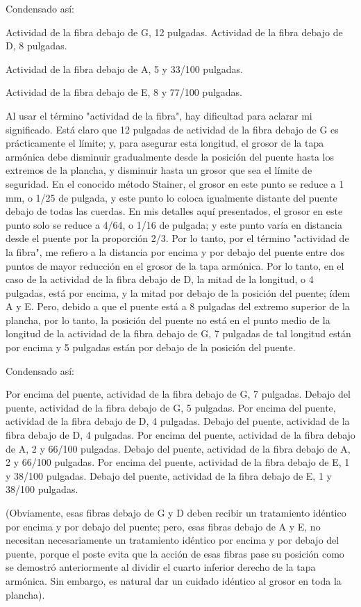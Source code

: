 \documentclass[12pt]{book}
\begin{document}
Condensado así:

Actividad de la fibra debajo de G, 12 pulgadas. Actividad de la fibra debajo de D, 8 pulgadas.

Actividad de la fibra debajo de A, 5 y 33/100 pulgadas.

Actividad de la fibra debajo de E, 8 y 77/100 pulgadas.

Al usar el término "actividad de la fibra", hay dificultad para aclarar mi significado. Está claro que 12 pulgadas de actividad de la fibra debajo de G es prácticamente el límite; y, para asegurar esta longitud, el grosor de la tapa armónica debe disminuir gradualmente desde la posición del puente hasta los extremos de la plancha, y disminuir hasta un grosor que sea el límite de seguridad. En el conocido método Stainer, el grosor en este punto se reduce a 1 mm, o 1/25 de pulgada, y este punto lo coloca igualmente distante del puente debajo de todas las cuerdas. En mis detalles aquí presentados, el grosor en este punto solo se reduce a 4/64, o 1/16 de pulgada; y este punto varía en distancia desde el puente por la proporción 2/3. Por lo tanto, por el término "actividad de la fibra", me refiero a la distancia por encima y por debajo del puente entre dos puntos de mayor reducción en el grosor de la tapa armónica. Por lo tanto, en el caso de la actividad de la fibra debajo de D, la mitad de la longitud, o 4 pulgadas, está por encima, y la mitad por debajo de la posición del puente; ídem A y E. Pero, debido a que el puente está a 8 pulgadas del extremo superior de la plancha, por lo tanto, la posición del puente no está en el punto medio de la longitud de la actividad de la fibra debajo de G, 7 pulgadas de tal longitud están por encima y 5 pulgadas están por debajo de la posición del puente.

Condensado así:

Por encima del puente, actividad de la fibra debajo de G, 7 pulgadas. Debajo del puente, actividad de la fibra debajo de G, 5 pulgadas. Por encima del puente, actividad de la fibra debajo de D, 4 pulgadas. Debajo del puente, actividad de la fibra debajo de D, 4 pulgadas. Por encima del puente, actividad de la fibra debajo de A, 2 y 66/100 pulgadas. Debajo del puente, actividad de la fibra debajo de A, 2 y 66/100 pulgadas. Por encima del puente, actividad de la fibra debajo de E, 1 y 38/100 pulgadas. Debajo del puente, actividad de la fibra debajo de E, 1 y 38/100 pulgadas.

(Obviamente, esas fibras debajo de G y D deben recibir un tratamiento idéntico por encima y por debajo del puente; pero, esas fibras debajo de A y E, no necesitan necesariamente un tratamiento idéntico por encima y por debajo del puente, porque el poste evita que la acción de esas fibras pase su posición como se demostró anteriormente al dividir el cuarto inferior derecho de la tapa armónica. Sin embargo, es natural dar un cuidado idéntico al grosor en toda la plancha).
\end{document}
